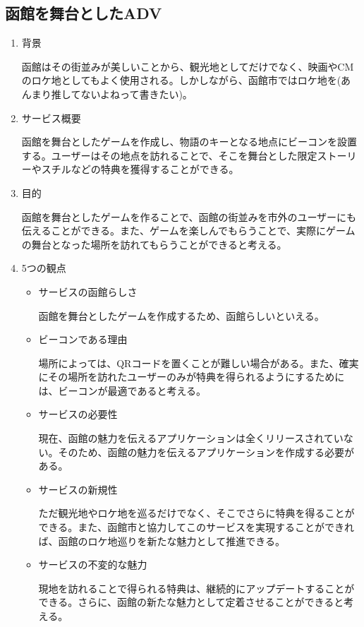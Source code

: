 \subsection{函館を舞台としたADV}
\begin{enumerate}
    \item 背景
    \par 函館はその街並みが美しいことから、観光地としてだけでなく、映画やCMのロケ地としてもよく使用される。しかしながら、函館市ではロケ地を(あんまり推してないよねって書きたい)。
    \item サービス概要
    \par 函館を舞台としたゲームを作成し、物語のキーとなる地点にビーコンを設置する。ユーザーはその地点を訪れることで、そこを舞台とした限定ストーリーやスチルなどの特典を獲得することができる。
    \item 目的
    \par 函館を舞台としたゲームを作ることで、函館の街並みを市外のユーザーにも伝えることができる。また、ゲームを楽しんでもらうことで、実際にゲームの舞台となった場所を訪れてもらうことができると考える。
    \item 5つの観点
    \begin{itemize}
        \item サービスの函館らしさ
        \par 函館を舞台としたゲームを作成するため、函館らしいといえる。
        \item ビーコンである理由
        \par 場所によっては、QRコードを置くことが難しい場合がある。また、確実にその場所を訪れたユーザーのみが特典を得られるようにするためには、ビーコンが最適であると考える。
        \item サービスの必要性
        \par 現在、函館の魅力を伝えるアプリケーションは全くリリースされていない。そのため、函館の魅力を伝えるアプリケーションを作成する必要がある。
        \item サービスの新規性
        \par ただ観光地やロケ地を巡るだけでなく、そこでさらに特典を得ることができる。また、函館市と協力してこのサービスを実現することができれば、函館のロケ地巡りを新たな魅力として推進できる。
        \item サービスの不変的な魅力
        \par 現地を訪れることで得られる特典は、継続的にアップデートすることができる。さらに、函館の新たな魅力として定着させることができると考える。
    \end{itemize}
\end{enumerate}

